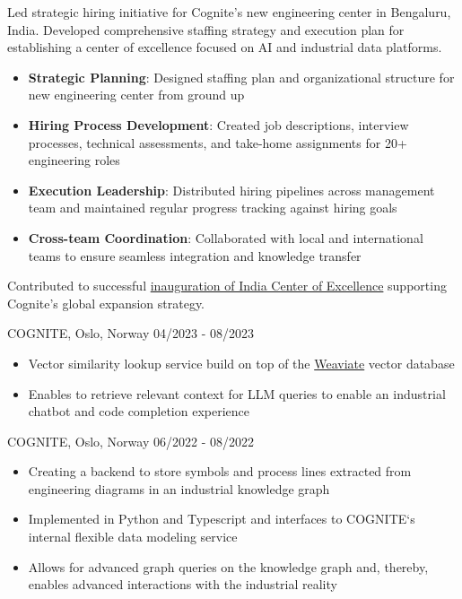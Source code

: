 \documentclass[singlesided,
               paper=a4,
               fontsize=10pt
              ]{my-resume}
\begin{document}
    {
        Led strategic hiring initiative for Cognite's new engineering center in Bengaluru, India. Developed comprehensive staffing strategy and execution plan for establishing a center of excellence focused on AI and industrial data platforms.

        \begin{itemize}[leftmargin=2em]
            \item \textbf{Strategic Planning}: Designed staffing plan and organizational structure for new engineering center from ground up
            \item \textbf{Hiring Process Development}: Created job descriptions, interview processes, technical assessments, and take-home assignments for 20+ engineering roles
            \item \textbf{Execution Leadership}: Distributed hiring pipelines across management team and maintained regular progress tracking against hiring goals
            \item \textbf{Cross-team Coordination}: Collaborated with local and international teams to ensure seamless integration and knowledge transfer
        \end{itemize}

        Contributed to successful \href{https://www.cognite.com/en/company/newsroom/cognite-inaugurates-india-center-of-excellence-in-bengaluru-with-commitment-to-leveraging-ai-for-industrial-growth}{inauguration of India Center of Excellence} supporting Cognite's global expansion strategy.
    }
%
	{COGNITE, Oslo, Norway}
	{04/2023 - 08/2023}
    {\begin{itemize}[leftmargin=2em]
		\item Vector similarity lookup service build on top of the \href{https://weaviate.io/}{Weaviate} vector database
		\item Enables to retrieve relevant context for LLM queries to enable an industrial chatbot and code completion experience
	\end{itemize}}
%
	{COGNITE, Oslo, Norway}
	{06/2022 - 08/2022}
    {\begin{itemize}[leftmargin=2em]
		\item Creating a backend to store symbols and process lines extracted from engineering diagrams in an industrial knowledge graph
		\item Implemented in Python and Typescript and interfaces to COGNITE`s internal flexible data modeling service
		\item Allows for advanced graph queries on the knowledge graph and, thereby, enables advanced interactions with the industrial reality
	\end{itemize}}
\end{document}
